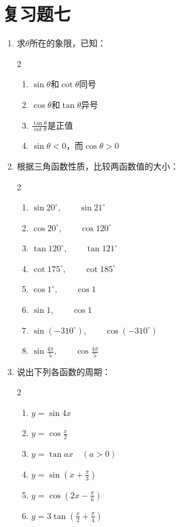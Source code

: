 \section*{复习题七}
\begin{enumerate}
    \item 求$\theta$所在的象限，已知：
\begin{multicols}{2}
\begin{enumerate}
    \item $\sin\theta$和$\cot \theta$同号
    \item $\cos\theta$和$\tan \theta$异号
    \item $\frac{\tan\theta}{\cot\theta}$是正值
    \item $\sin\theta <0$，而$\cos\theta>0$
\end{enumerate}
\end{multicols}
\item 根据三角函数性质，比较两函数值的大小：
\begin{multicols}{2}
    \begin{enumerate}
        \item $\sin 20^{\circ},\qquad \sin 21^{\circ}$
        \item $\cos 20^{\circ},\qquad \cos 120^{\circ}$
        \item $\tan 120^{\circ},\qquad \tan 121^{\circ}$
        \item $\cot175^{\circ},\qquad \cot 185^{\circ}$
        \item $\cos 1^{\circ},\qquad \cos 1$
        \item $\sin 1,\qquad \cos 1$
        \item $\sin(-310^{\circ}),\qquad \cos(-310^{\circ})$
        \item $\sin\frac{4\pi}{5},\qquad \cos\frac{4\pi}{5}$
    \end{enumerate}
    \end{multicols}


\item 说出下列各函数的周期：
\begin{multicols}{2}
\begin{enumerate}
    \item $y=\sin 4x$
    \item $y=\cos\frac{x}{2}$
    \item $y=\tan ax \quad (a>0)$
    \item $y=\sin\left(x+\frac{\pi}{3}\right)$
    \item $y=\cos\left(2x-\frac{\pi}{6}\right)$
    \item $y=3\tan\left(\frac{x}{2}+\frac{\pi}{4}\right)$
\end{enumerate}
\end{multicols}


\end{enumerate}
